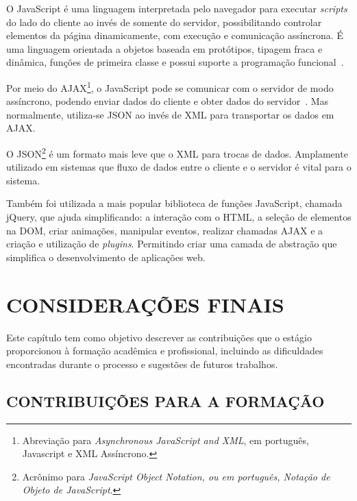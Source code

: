\documentclass[
  12pt,				%
  openany,
  oneside,
  a4paper,			%
  english,			%
  brazil
]{article}
\numberwithin{figure}{section}
\numberwithin{table}{section}
\newcounter{subsubsubsection}[subsubsection]
\begin{document}



O JavaScript é uma linguagem interpretada pelo navegador para executar \textit{scripts} do lado do cliente ao invés de somente do servidor, possibilitando controlar elementos da página dinamicamente, com execução e comunicação assíncrona. É uma linguagem orientada a objetos baseada em protótipos, tipagem fraca e dinâmica, funções de primeira classe e possui suporte a programação funcional~\cite{PHP_Novatec_dev}.

Por meio do AJAX\footnote{Abreviação para \textit{Asynchronous JavaScript and XML}, em português, Javascript e XML Assíncrono.}, o JavaScript pode se comunicar com o servidor de modo assíncrono, podendo enviar dados do cliente e obter dados do servidor~\cite{PHP_Novatec_ajax}. Mas normalmente, utiliza-se JSON ao invés de XML para transportar os dados em AJAX.

O JSON\footnote{Acrônimo para \textit{JavaScript Object Notation, ou em português, Notação de Objeto de JavaScript}.} é um formato mais leve que o XML para trocas de dados. Amplamente utilizado em sistemas que fluxo de dados entre o cliente e o servidor é vital para o sistema.

Também foi utilizada a mais popular biblioteca de funções JavaScript, chamada jQuery, que ajuda simplificando: a interação com o HTML, a seleção de elementos na DOM, criar animações, manipular eventos, realizar chamadas AJAX e a criação e utilização de \textit{plugins}. Permitindo criar uma camada de abstração que simplifica o desenvolvimento de aplicações web.




\clearpage
\section{CONSIDERAÇÕES FINAIS}


Este capítulo tem como objetivo descrever as contribuições que o estágio proporcionou à formação acadêmica e profissional, incluindo as dificuldades encontradas durante o processo e sugestões de futuros trabalhos.


\subsection{CONTRIBUIÇÕES PARA A FORMAÇÃO}
\end{document}
